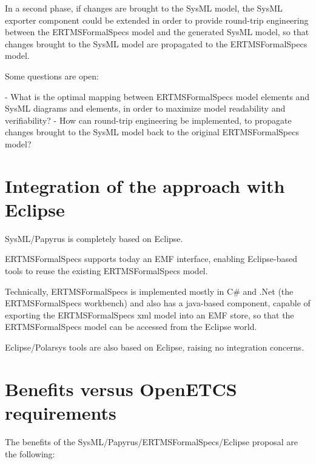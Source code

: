 In a second phase, if changes are brought to the SysML model, the SysML exporter component could be extended in order to provide round-trip engineering between the ERTMSFormalSpecs model and the generated SysML model, so that changes brought to the SysML model are propagated to the ERTMSFormalSpecs model.

Some questions are open:

- What is the optimal mapping between ERTMSFormalSpecs model elements and SysML diagrams and elements, in order to maximize model readability and verifiability? 
- How can round-trip engineering be implemented, to propagate changes brought to the SysML model back to the original ERTMSFormalSpecs model?

\section{Integration of the approach with Eclipse}

SysML/Papyrus is completely based on Eclipse.

ERTMSFormalSpecs supports today an EMF interface, enabling Eclipse-based tools to reuse the existing ERTMSFormalSpecs model.

Technically, ERTMSFormalSpecs is implemented mostly in C\# and .Net (the ERTMSFormalSpecs workbench) and also has a java-based component, capable of exporting the ERTMSFormalSpecs xml model into an EMF store, so that the ERTMSFormalSpecs model can be accessed from the Eclipse world. 

Eclipse/Polarsys tools are also based on Eclipse, raising no integration concerns.

\section{Benefits versus OpenETCS requirements}

The benefits of the SysML/Papyrus/ERTMSFormalSpecs/Eclipse proposal are the following:

